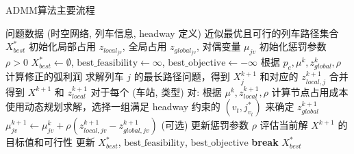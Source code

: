 \documentclass{article}
\begin{document}
    \begin{algorithm}[h]
        \caption{ADMM算法主要流程}
        \begin{algorithmic}[1]
            \Require 问题数据 (时空网络, 列车信息, headway 定义)
            \Ensure 近似最优且可行的列车路径集合 $X_{best}^*$
            \State 初始化局部占用 $z_{local_{jv}}$, 全局占用 $z_{global_{jv}}$, 对偶变量 $\mu_{jv}$
            \State 初始化惩罚参数 $\rho > 0$
            \State $X_{best}^* \gets \emptyset$,
            $\text{best\_feasibility} \gets \infty$,
            $\text{best\_objective} \gets -\infty$
                \State {}
                    \State 根据 $p_e, \mu^k, z_{global}^k, \rho$ 计算修正的弧利润
                    \State 求解列车 $j$ 的最长路径问题，得到 $X_j^{k+1}$ 和对应的 $z_{local,j}^{k+1}$
                \EndFor
                \State 合并得到 $X^{k+1}$ 和 $z_{local}^{k+1}$
                \State {}
                \State 对于每个 (车站, 类型) 对:
                \State \quad 根据 $\mu^k, z_{local}^{k+1}, \rho$ 计算节点占用成本
                \State \quad 使用动态规划求解，选择一组满足 headway 约束的 $(v_t, j^*_{v_t})$
                来确定 $z_{global}^{k+1}$
                \State {}
                \State $\mu_{jv}^{k+1} \gets \mu_{jv}^k + \rho
                (z_{local,jv}^{k+1} - z_{global,jv}^{k+1})$
                \State (可选) 更新惩罚参数 $\rho$
                \State 评估当前解 $X^{k+1}$ 的目标值和可行性
                    \State 更新 $X_{best}^*$, $\text{best\_feasibility}$,
                    $\text{best\_objective}$
                \EndIf
                    \State \textbf{break}
                \EndIf
            \EndFor
            \State \Return $X_{best}^*$
        \end{algorithmic}\label{alg:algorithm}
    \end{algorithm}
\end{document}
